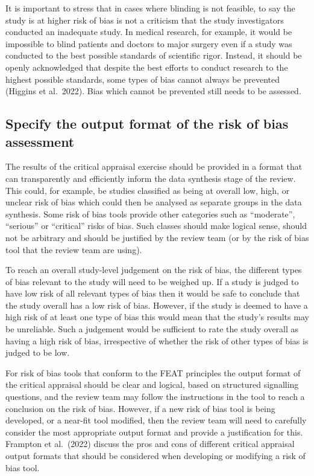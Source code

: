 \documentclass[
  letterpaper,
  DIV=11,
  numbers=noendperiod]{scrreprt}
\begin{document}
It is important to stress that in cases where blinding is not feasible,
to say the study is at higher risk of bias is not a criticism that the
study investigators conducted an inadequate study. In medical research,
for example, it would be impossible to blind patients and doctors to
major surgery even if a study was conducted to the best possible
standards of scientific rigor. Instead, it should be openly acknowledged
that despite the best efforts to conduct research to the highest
possible standards, some types of bias cannot always be prevented
(Higgins et al.~2022). Bias which cannot be prevented still needs to be
assessed.

\subsection{Specify the output format of the risk of bias
assessment}\label{specify-the-output-format-of-the-risk-of-bias-assessment}

The results of the critical appraisal exercise should be provided in a
format that can transparently and efficiently inform the data synthesis
stage of the review. This could, for example, be studies classified as
being at overall low, high, or unclear risk of bias which could then be
analysed as separate groups in the data synthesis. Some risk of bias
tools provide other categories such as ``moderate'', ``serious'' or
``critical'' risks of bias. Such classes should make logical sense,
should not be arbitrary and should be justified by the review team (or
by the risk of bias tool that the review team are using).

To reach an overall study-level judgement on the risk of bias, the
different types of bias relevant to the study will need to be weighed
up. If a study is judged to have low risk of all relevant types of bias
then it would be safe to conclude that the study overall has a low risk
of bias. However, if the study is deemed to have a high risk of at least
one type of bias this would mean that the study's results may be
unreliable. Such a judgement would be sufficient to rate the study
overall as having a high risk of bias, irrespective of whether the risk
of other types of bias is judged to be low.

For risk of bias tools that conform to the FEAT principles the output
format of the critical appraisal should be clear and logical, based on
structured signalling questions, and the review team may follow the
instructions in the tool to reach a conclusion on the risk of bias.
However, if a new risk of bias tool is being developed, or a near-fit
tool modified, then the review team will need to carefully consider the
most appropriate output format and provide a justification for this.
Frampton et al.~(2022) discuss the pros and cons of different critical
appraisal output formats that should be considered when developing or
modifying a risk of bias tool.
\end{document}
